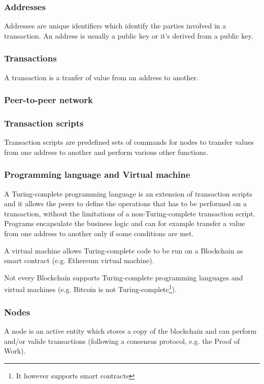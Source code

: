 \subsubsection*{Addresses}
Addresses are unique identifiers which identify the parties involved in a
transaction. An address is usually a public key or it's derived from a public key.


\subsubsection*{Transactions}
A transaction is a tranfer of value from an address to another.


\subsubsection*{Peer-to-peer network}


\subsubsection*{Transaction scripts}
Transaction scripts are predefined sets of commands for nodes to transfer values
from one address to another and perform various other functions.


\subsubsection*{Programming language and Virtual machine}
A Turing-complete programming language is an extension of transaction scripts and
it allows the peers to define the operations that has to be performed on a
transaction, without the limitations of a non-Turing-complete transaction script.
Programs encapsulate the business logic and can for example transfer a value
from one address to another only if some conditions are met.

A virtual machine allows Turing-complete code to be run on a Blockchain as
smart contract (e.g. Ethereum virtual machine).

Not every Blockchain supports Turing-complete programming languages and virtual
machines (e.g. Bitcoin is not Turing-complete\footnote{It however supports
smart contracts}).


\subsubsection*{Nodes}
A node is an active entity which stores a copy of the blockchain and can perform
and/or valide transactions (following a consensus protocol, e.g. the Proof of Work).

